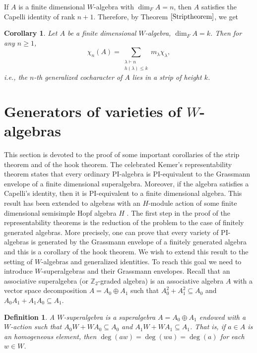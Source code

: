 \documentclass{article}
\newtheorem{corollary}[theorem]{Corollary}
\newtheorem{definition}[theorem]{Definition}
\begin{document}
If $A$ is a finite dimensional $W$-algebra with $\dim_F A=n$, then $A$ satisfies the Capelli identity of rank $n+1$. Therefore, by Theorem $\ref{Striptheorem}$, we get 
\begin{corollary}
	Let $A$ be a finite dimensional $W$-algebra, $\dim_F A=k$. Then for any $n \geq 1$, 
	\[
	\chi_n(A)=\sum_{\substack{\lambda \vdash n \\ h(\lambda) \leq k}}m_\lambda \chi_\lambda,
	\]
	i.e., the $n$-th generalized cocharacter of $A$ lies in a strip of height $k$.
\end{corollary}

\section{Generators of varieties of $W$-algebras}

This section is devoted to the proof of some important corollaries of the strip theorem and of the hook theorem. The celebrated Kemer's representability theorem \cite{Kem84} states that every ordinary PI-algebra is PI-equivalent to the Grassmann envelope of a finite dimensional superalgebra. Moreover, if the algebra satisfies a Capelli's identity, then it is PI-equivalent to a finite dimensional algebra. This result has been extended to algebras with an $H$-module action of some finite dimensional semisimple Hopf algebra $H$ \cite{Kar16}. The first step in the proof of the representability theorems is the reduction of the problem to the case of finitely generated algebras. More precisely, one can prove that every variety of PI-algebras is generated by the Grassmann envelope of a finitely generated algebra and this is a corollary of the hook theorem. We wish to extend this result to the setting of $W$-algebras and generalized identities.
To reach this goal we need to introduce $W$-superalgebras and their Grassmann envelopes. Recall that an associative superalgebra (or $\mathbb{Z}_2$-graded algebra) is an associative algebra $A$ with a vector space decomposition $A=A_0\oplus A_1$ such that $A_0^2+A_1^2\subseteq A_0$ and $A_0A_1+A_1A_0\subseteq A_1$. 

\begin{definition}
	A $W$-superalgebra is a superalgebra $A=A_0 \oplus A_1$ endowed with a $W$-action such that $A_0W + WA_0\subseteq A_0$ and $A_1W + WA_1\subseteq A_1$. That is, if $a\in A$ is an homogeneous element, then $\deg(aw)=\deg(wa)=\deg(a)$ for each $w\in W$.
\end{definition}
\end{document}
